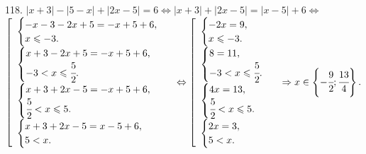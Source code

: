 118. $|x+3|-|5-x|+|2x-5|=6\Leftrightarrow |x+3|+|2x-5|=|x-5|+6\Leftrightarrow$\\$ \left[\begin{array}{l}\begin{cases} -x-3-2x+5=-x+5+6,\\ x\leqslant-3.\end{cases}\\
\begin{cases} x+3-2x+5=-x+5+6,\\ -3<x\leqslant\cfrac{5}{2}.\end{cases}\\ \begin{cases} x+3+2x-5=-x+5+6,\\ \cfrac{5}{2}<x\leqslant5.\end{cases}\\
\begin{cases} x+3+2x-5=x-5+6,\\ 5< x.\end{cases}\end{array}\right.\Leftrightarrow \left[\begin{array}{l}\begin{cases} -2x=9,\\ x\leqslant-3.\end{cases}\\
\begin{cases} 8=11,\\ -3<x\leqslant\cfrac{5}{2}.\end{cases}\\ \begin{cases} 4x=13,\\ \cfrac{5}{2}<x\leqslant5.\end{cases}\\
\begin{cases} 2x=3,\\ 5< x.\end{cases}\end{array}\right.\Rightarrow x\in\left\{-\cfrac{9}{2};\cfrac{13}{4}\right\}.$\\
